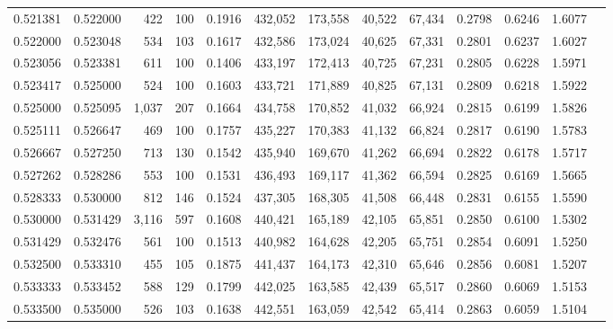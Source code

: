 \begin{tabular}{rrrrrrrrrrrrr}
0.521381 & 0.522000 &   422 & 100 &                                     0.1916 & 432,052 & 173,558 &  40,522 &  67,434 & 0.2798 & 0.6246 & 1.6077 \\
0.522000 & 0.523048 &   534 & 103 &                                     0.1617 & 432,586 & 173,024 &  40,625 &  67,331 & 0.2801 & 0.6237 & 1.6027 \\
0.523056 & 0.523381 &   611 & 100 &                                     0.1406 & 433,197 & 172,413 &  40,725 &  67,231 & 0.2805 & 0.6228 & 1.5971 \\
0.523417 & 0.525000 &   524 & 100 &                                     0.1603 & 433,721 & 171,889 &  40,825 &  67,131 & 0.2809 & 0.6218 & 1.5922 \\
0.525000 & 0.525095 & 1,037 & 207 &                                     0.1664 & 434,758 & 170,852 &  41,032 &  66,924 & 0.2815 & 0.6199 & 1.5826 \\
0.525111 & 0.526647 &   469 & 100 &                                     0.1757 & 435,227 & 170,383 &  41,132 &  66,824 & 0.2817 & 0.6190 & 1.5783 \\
0.526667 & 0.527250 &   713 & 130 &                                     0.1542 & 435,940 & 169,670 &  41,262 &  66,694 & 0.2822 & 0.6178 & 1.5717 \\
0.527262 & 0.528286 &   553 & 100 &                                     0.1531 & 436,493 & 169,117 &  41,362 &  66,594 & 0.2825 & 0.6169 & 1.5665 \\
0.528333 & 0.530000 &   812 & 146 &                                     0.1524 & 437,305 & 168,305 &  41,508 &  66,448 & 0.2831 & 0.6155 & 1.5590 \\
0.530000 & 0.531429 & 3,116 & 597 &                                     0.1608 & 440,421 & 165,189 &  42,105 &  65,851 & 0.2850 & 0.6100 & 1.5302 \\
0.531429 & 0.532476 &   561 & 100 &                                     0.1513 & 440,982 & 164,628 &  42,205 &  65,751 & 0.2854 & 0.6091 & 1.5250 \\
0.532500 & 0.533310 &   455 & 105 &                                     0.1875 & 441,437 & 164,173 &  42,310 &  65,646 & 0.2856 & 0.6081 & 1.5207 \\
0.533333 & 0.533452 &   588 & 129 &                                     0.1799 & 442,025 & 163,585 &  42,439 &  65,517 & 0.2860 & 0.6069 & 1.5153 \\
0.533500 & 0.535000 &   526 & 103 &                                     0.1638 & 442,551 & 163,059 &  42,542 &  65,414 & 0.2863 & 0.6059 & 1.5104 \\

\end{tabular}

